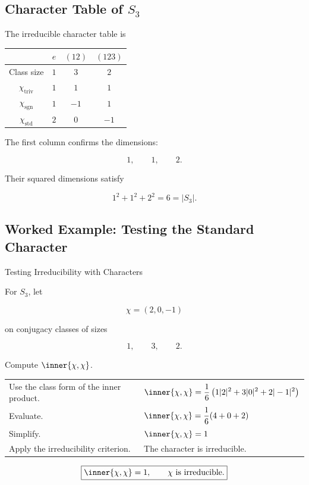 \subsection{Character Table of \(S_3\)}
\label{subsec:s3-character-table}

The irreducible character table is

\begin{center}
\begin{tabular}{c|ccc}
\toprule
 & \(e\) & \((12)\) & \((123)\)\\
\midrule
Class size & \(1\) & \(3\) & \(2\)\\
\midrule
\(\chi_{\mathrm{triv}}\) & \(1\) & \(1\) & \(1\)\\
\(\chi_{\mathrm{sgn}}\) & \(1\) & \(-1\) & \(1\)\\
\(\chi_{\mathrm{std}}\) & \(2\) & \(0\) & \(-1\)\\
\bottomrule
\end{tabular}
\end{center}

The first column confirms the dimensions:

\[ 1,\qquad1,\qquad2. \]

Their squared dimensions satisfy

\[ 1^2+1^2+2^2=6=|S_3|. \]

\subsection{Worked Example: Testing the Standard Character}
\label{subsec:worked-standard-character}

\begin{workedexamplebox}{Testing Irreducibility with Characters}

For \(S_3\), let

\[ \chi=(2,0,-1) \]

on conjugacy classes of sizes

\[ 1,\qquad3,\qquad2. \]

Compute \(\inner{\chi,\chi}\).

\begin{tabularx}{\textwidth}{@{}>{\raggedright\arraybackslash}p{}X@{}}
Use the class form of the inner product. &
\(\displaystyle
\inner{\chi,\chi}
=\frac16\left(1|2|^2+3|0|^2+2|-1|^2\right)\)\\
Evaluate. &
\(\displaystyle
\inner{\chi,\chi}
=\frac16(4+0+2)\)\\
Simplify. & \(\displaystyle \inner{\chi,\chi}=1\)\\
Apply the irreducibility criterion. & The character is irreducible.
\end{tabularx}

\begin{answerbox}
\[ \boxed{\inner{\chi,\chi}=1,\qquad\chi\text{ is irreducible}.} \]
\end{answerbox}
\end{workedexamplebox}

